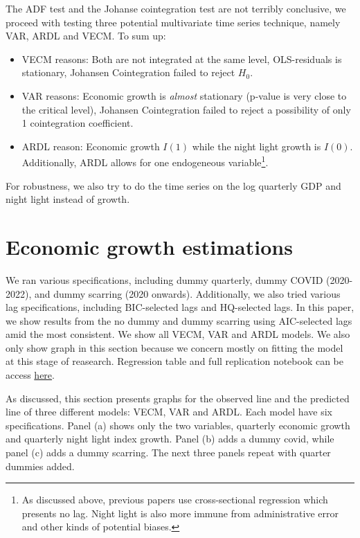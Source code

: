 \documentclass[
]{interact}
\begin{document}
The ADF test and the Johanse cointegration test are not terribly
conclusive, we proceed with testing three potential multivariate time
series technique, namely VAR, ARDL and VECM. To sum up:

\begin{itemize}
\item
  VECM reasons: Both are not integrated at the same level, OLS-residuals
  is stationary, Johansen Cointegration failed to reject \(H_0\).
\item
  VAR reasons: Economic growth is \emph{almost} stationary (p-value is
  very close to the critical level), Johansen Cointegration failed to
  reject a possibility of only 1 cointegration coefficient.
\item
  ARDL reason: Economic growth \(I(1)\) while the night light growth is
  \(I(0)\). Additionally, ARDL allows for one endogeneous
  variable\footnote{As discussed above, previous papers use
    cross-sectional regression which presents no lag. Night light is
    also more immune from administrative error and other kinds of
    potential biases.}.
\end{itemize}

For robustness, we also try to do the time series on the log quarterly
GDP and night light instead of growth.

\section{Economic growth estimations}\label{economic-growth-estimations}

We ran various specifications, including dummy quarterly, dummy COVID
(2020-2022), and dummy scarring (2020 onwards). Additionally, we also
tried various lag specifications, including BIC-selected lags and
HQ-selected lags. In this paper, we show results from the no dummy and
dummy scarring using AIC-selected lags amid the most consistent. We show
all VECM, VAR and ARDL models. We also only show graph in this section
because we concern mostly on fitting the model at this stage of
reasearch. Regression table and full replication notebook can be access
\href{nitelite3stata.html}{here}.

As discussed, this section presents graphs for the observed line and the
predicted line of three different models: VECM, VAR and ARDL. Each model
have six specifications. Panel (a) shows only the two variables,
quarterly economic growth and quarterly night light index growth. Panel
(b) adds a dummy covid, while panel (c) adds a dummy scarring. The next
three panels repeat with quarter dummies added.
\end{document}
